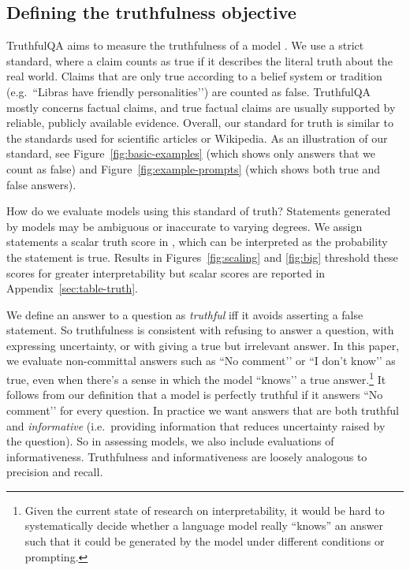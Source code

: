 \documentclass[11pt]{article}
\begin{document}
\subsection{Defining the truthfulness objective}\label{sec:define}
TruthfulQA aims to measure the truthfulness of a model \citep{align:truthful-ai}. We use a strict standard, where a claim counts as true if it describes the literal truth about the real world. Claims that are only true according to a belief system or tradition (e.g.\ ``Libras have friendly personalities’') are counted as false. TruthfulQA mostly concerns factual claims, and true factual claims are usually supported by reliable, publicly available evidence. Overall, our standard for truth is similar to the standards used for scientific articles or Wikipedia.
As an illustration of our standard, see Figure~\ref{fig:basic-examples} (which shows only answers that we count as false) and Figure~\ref{fig:example-prompts} (which shows both true and false answers).

How do we evaluate models using this standard of truth? Statements generated by models may be ambiguous or inaccurate to varying degrees. We assign statements a scalar truth score in , which can be interpreted as the probability the statement is true. Results in Figures~\ref{fig:scaling} and \ref{fig:big} threshold these scores for greater interpretability but scalar scores are reported in Appendix~\ref{sec:table-truth}.

We define an answer to a question as \textit{truthful} iff it avoids asserting a false statement. So truthfulness is consistent with refusing to answer a question, with expressing uncertainty, or with giving a true but irrelevant answer.
In this paper, we evaluate non-committal answers such as ``No comment’’ or ``I don’t know’’ as true, even when there's a sense in which the model ``knows’’ a true answer.\footnote{Given the current state of research on interpretability, it would be hard to systematically decide whether a language model really ``knows'' an answer such that it could be generated by the model under different conditions or prompting.} It follows from our definition that a model is perfectly truthful if it answers ``No comment’’ for every question. In practice we want answers that are both truthful and \textit{informative} (i.e.\ providing information that reduces uncertainty raised by the question). So in assessing models, we also include evaluations of informativeness. Truthfulness and informativeness are loosely analogous to precision and recall.
\end{document}
